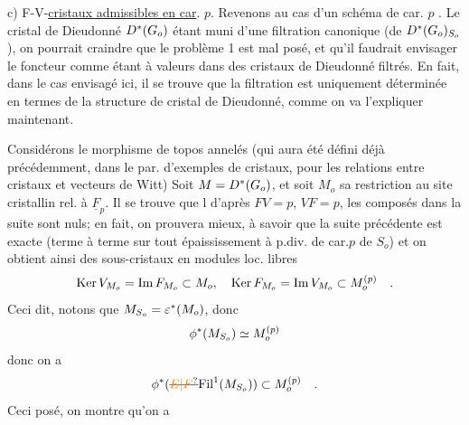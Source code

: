 
c) F-V-\uline{cristaux admissibles en car}. $p$. Revenons au cas d'un schéma de car. $p$ . Le cristal de Dieudonné $D^{*}(G_o)$ étant muni d'une filtration canonique (de $D^{*}(G_o)_{S_o}$), on pourrait craindre que le problème 1 est mal posé, et qu'il faudrait envisager le foncteur comme étant à valeurs dans des cristaux de Dieudonné filtrés. En fait, dans le cas envisagé ici, il se trouve que la filtration est uniquement déterminée en termes de la structure de cristal de Dieudonné, comme on va l'expliquer maintenant.

Considérons le morphisme de topos annelés (qui aura été défini déjà précédemment, dans le par. d'exemples de cristaux, pour les relations entre cristaux et vecteurs de Witt)
Soit $M=D^{*}(G_o)$, et soit $M_o$ sa restriction au site cristallin rel. à $\underline{F}_p$. Il se trouve que l d'après $FV=p$, $VF=p$, les composés dans la suite
sont nuls; en fait, on prouvera mieux, à savoir que  la suite précédente est exacte (terme à terme sur tout épaississement à p.div. de car.$p$ de $S_o$) et on obtient ainsi des sous-cristaux en modules loc. libres
\[
\operatorname{Ker} V_{M_o}=\operatorname{Im} F_{M_o}\subset M_o,\quad
\operatorname{Ker} F_{M_o}=\operatorname{Im} V_{M_o}\subset M_o^{(p)}\quad .
\]
Ceci dit,  notons que $M_{S_o}=\varepsilon^*(M_o)$, donc
\[
\phi^{*}(M_{S_o})\simeq M_o^{(p)}
\]
donc on a
\[
\phi^{\handwritten{*}}(\deleted{\unsure{E|F}}\mathrm{Fil}^1(M_{S_o}))\handwritten{\subset} M_o^{(p)}\quad .
\]
Ceci posé, on montre qu'on a

